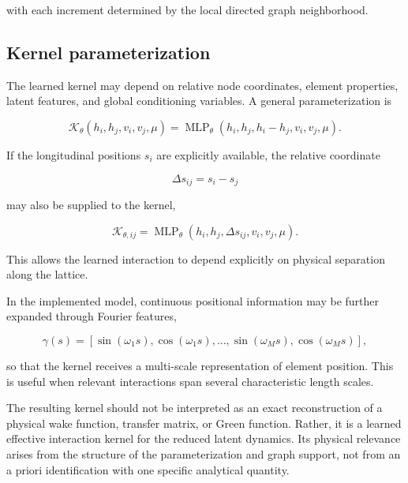 with each increment determined by the local directed graph neighborhood.

\subsection{Kernel parameterization}
\label{sec:04_machine_learning_methodology_kernel_parameterization}

The learned kernel may depend on relative node coordinates, element properties, latent features, and global conditioning variables. A general parameterization is

\begin{equation}
\label{eq:125}
\mathcal K_{\theta}(h_i,h_j,v_i,v_j,\mu)=\operatorname{MLP}_{\theta}(h_i,h_j,h_i-h_j,v_i,v_j,\mu).
\end{equation}

If the longitudinal positions \(s_{i}\) are explicitly available, the relative coordinate

\begin{equation}
\label{eq:126}
\Delta s_{ij}=s_i-s_j
\end{equation}

may also be supplied to the kernel,

\begin{equation}
\label{eq:127}
\mathcal K_{\theta,ij}=\operatorname{MLP}_{\theta}(h_i,h_j,\Delta s_{ij},v_i,v_j,\mu).
\end{equation}

This allows the learned interaction to depend explicitly on physical separation along the lattice.

In the implemented model, continuous positional information may be further expanded through Fourier features,

\begin{equation}
\label{eq:128}
\gamma(s)=[\sin(\omega_1s),\cos(\omega_1s),\ldots,\sin(\omega_Ms),\cos(\omega_Ms)],
\end{equation}

so that the kernel receives a multi-scale representation of element position. This is useful when relevant interactions span several characteristic length scales.

The resulting kernel should not be interpreted as an exact reconstruction of a physical wake function, transfer matrix, or Green function. Rather, it is a learned effective interaction kernel for the reduced latent dynamics. Its physical relevance arises from the structure of the parameterization and graph support, not from an a priori identification with one specific analytical quantity.

